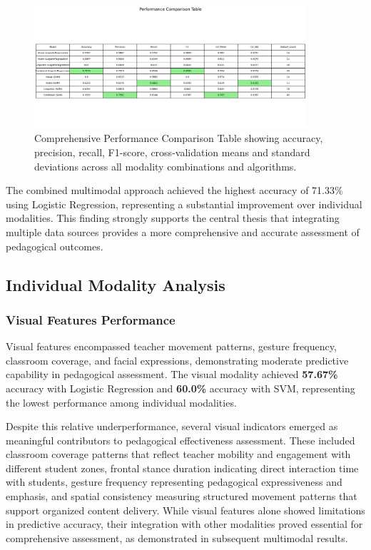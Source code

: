 \begin{figure}[H]
    \centering
    \includegraphics[width=0.9\textwidth]{sections/performance_table.jpg}
    \caption{Comprehensive Performance Comparison Table showing accuracy, precision, recall, F1-score, cross-validation means and standard deviations across all modality combinations and algorithms.}
    \label{fig:performance_table}
\end{figure}

The combined multimodal approach achieved the highest accuracy of 71.33\% using Logistic Regression, representing a substantial improvement over individual modalities. This finding strongly supports the central thesis that integrating multiple data sources provides a more comprehensive and accurate assessment of pedagogical outcomes.

\subsection{Individual Modality Analysis}

\subsubsection{Visual Features Performance}

Visual features encompassed teacher movement patterns, gesture frequency, classroom coverage, and facial expressions, demonstrating moderate predictive capability in pedagogical assessment. The visual modality achieved \textbf{57.67\%} accuracy with Logistic Regression and \textbf{60.0\%} accuracy with SVM, representing the lowest performance among individual modalities.

Despite this relative underperformance, several visual indicators emerged as meaningful contributors to pedagogical effectiveness assessment. These included classroom coverage patterns that reflect teacher mobility and engagement with different student zones, frontal stance duration indicating direct interaction time with students, gesture frequency representing pedagogical expressiveness and emphasis, and spatial consistency measuring structured movement patterns that support organized content delivery. While visual features alone showed limitations in predictive accuracy, their integration with other modalities proved essential for comprehensive assessment, as demonstrated in subsequent multimodal results.

